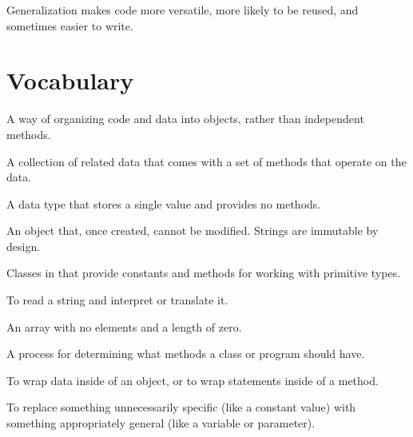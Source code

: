 Generalization makes code more versatile, more likely to be reused, and sometimes easier to write.






\section{Vocabulary}

\begin{description}

A way of organizing code and data into objects, rather than independent methods.

A collection of related data that comes with a set of methods that operate on the data.

A data type that stores a single value and provides no methods.

An object that, once created, cannot be modified.
Strings are immutable by design.

Classes in  that provide constants and methods for working with primitive types.

To read a string and interpret or translate it.

An array with no elements and a length of zero.

A process for determining what methods a class or program should have.

To wrap data inside of an object, or to wrap statements inside of a method.

To replace something unnecessarily specific (like a constant value) with something appropriately general (like a variable or parameter).

\end{description}


